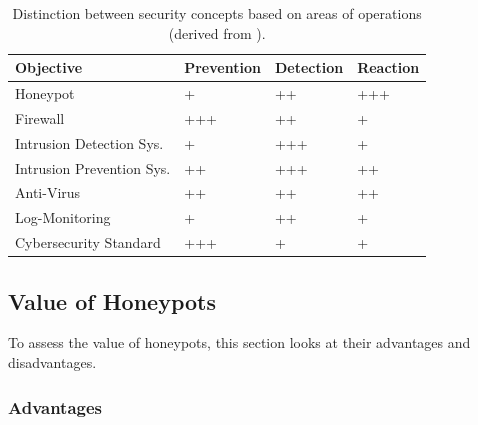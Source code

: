 \begin{table}[ht]
    \centering
    \caption[Distinction between security concepts]{
        Distinction between security concepts based on areas of operations (derived from \cite{NawrockiWSKS2016}).
    }
    \begin{tabular}{l|lll}
        \toprule
        \textbf{Objective}        & \textbf{Prevention} & \textbf{Detection} & \textbf{Reaction} \\ \hline
        Honeypot                  & +                   & ++                 & +++               \\
        Firewall                  & +++                 & ++                 & +                 \\
        Intrusion Detection Sys.  & +                   & +++                & +                 \\
        Intrusion Prevention Sys. & ++                  & +++                & ++                \\
        Anti-Virus                & ++                  & ++                 & ++                \\
        Log-Monitoring            & +                   & ++                 & +                 \\
        Cybersecurity Standard    & +++                 & +                  & +                 \\
        \bottomrule
    \end{tabular}
    \label{tab:honeypots-security-concepts}
\end{table}

\subsection{Value of Honeypots}

To assess the value of honeypots, this section looks at their advantages and disadvantages. \cite{Mokube2007,Kaur2014,Spitzner2003}

\subsubsection{Advantages}

